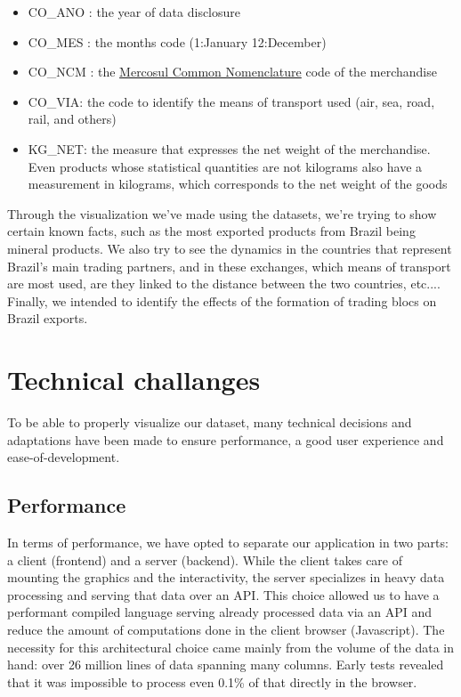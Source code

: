 \documentclass[12pt,a4]{article}
\begin{document}
\begin{itemize}
    \item CO\_ANO : the year of data disclosure
    \item CO\_MES : the months code (1:January 12:December)
    \item CO\_NCM : the \href{https://www.novatradebrasil.com/en/customs-code-classification-brazil-ncm/}{Mercosul Common Nomenclature} code of the merchandise
    \item CO\_VIA: the code to identify the means of transport used (air, sea, road, rail, and others)
    \item KG\_NET: the measure that expresses the net weight of the merchandise. Even products whose statistical quantities are not kilograms also have a measurement in kilograms, which corresponds to the net weight of the goods
\end{itemize}
Through the visualization we've made using the datasets, we're trying to show certain known facts, such as the most exported products from Brazil being mineral products. We also try to see the dynamics in the countries that represent Brazil's main trading partners, and in these exchanges, which means of transport are most used, are they linked to the distance between the two countries, etc.... Finally, we intended to identify the effects of the formation of trading blocs on Brazil exports.

\section{Technical challanges}

To be able to properly visualize our dataset, many technical decisions and adaptations have been made to ensure performance, a good user experience and ease-of-development.

\subsection{Performance}

In terms of performance, we have opted to separate our application in two parts: a client (frontend) and a server (backend). While the client takes care of mounting the graphics and the interactivity, the server specializes in heavy data processing and serving that data over an API. This choice allowed us to have a performant compiled language serving already processed data via an API and reduce the amount of computations done in the client browser (Javascript). The necessity for this architectural choice came mainly from the volume of the data in hand: over 26 million lines of data spanning many columns. Early tests revealed that it was impossible to process even 0.1\% of that directly in the browser. 
\end{document}
